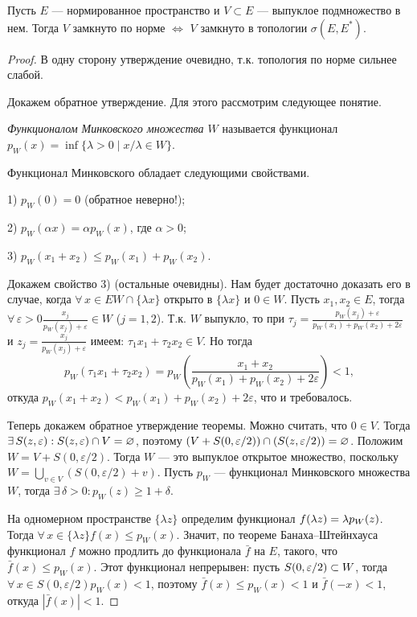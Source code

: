 \documentclass[10pt,titlepage, a4paper]{article}
\begin{document}
\begin{theorem}
Пусть $E$ --- нормированное пространство  и $V\subset E$ ---
выпуклое подмножество в нем. Тогда $V$ замкнуто по норме
$\Leftrightarrow$ $V$ замкнуто в топологии $\sigma(E, E^*)$.
\end{theorem}

\begin{proof}
В одну сторону утверждение очевидно, т.к. топология по норме сильнее
слабой.

Докажем обратное утверждение. Для этого рассмотрим следующее
понятие.

\begin{defen}
\emph{Функционалом Минковского множества $W$} называется функционал
$p_W(x)=\inf\{\lambda>0\mid x/\lambda\in W\}$.
\end{defen}

Функционал Минковского обладает следующими свойствами.

1) $p_W(0)=0$  (обратное неверно!);

2) $p_W(\alpha x)=\alpha p_W(x)$, где $\alpha>0$;

3) $p_W(x_1+x_2)\leqslant p_W(x_1)+p_W(x_2)$.

Докажем свойство 3) (остальные очевидны). Нам будет достаточно
доказать его в случае, когда $\forall\,x\in E$\;\;$W\cap\{\lambda
x\}$ открыто в $\{\lambda x\}$ и $0\in W$. Пусть $x_1,x_2\in E$,
тогда
$\forall\,\varepsilon>0$\;\;$\frac{x_j}{p_W(x_j)+\varepsilon}\in W$
($j=1,2$). Т.к. $W$ выпукло, то при
$\tau_j=\frac{p_W(x_j)+\varepsilon}{p_W(x_1)+p_W(x_2)+2\varepsilon}$
и $z_j=\frac{x_j}{p_W(x_j)+\varepsilon}$ имеем: $\tau_1
x_1+\tau_2x_2\in V$. Но тогда $$p_W(\tau_1 x_1+\tau_2x_2)=p_W\left(
\frac{x_1+x_2}{p_W(x_1)+p_W(x_2)+2\varepsilon}\right)<1,$$ откуда
$p_W(x_1+x_2)<p_W(x_1)+p_W(x_2)+2\varepsilon$, что и требовалось.

Теперь докажем обратное утверждение теоремы. Можно считать, что
$0\in V$. Тогда $\exists\,S(z,\varepsilon):S(z,\varepsilon)\p\cap
V=\varnothing$, поэтому
$(V+S(0,\varepsilon/2))\p\cap(S(z,\varepsilon/2))=\varnothing$.
Положим $W=V+S(0,\varepsilon/2)$. Тогда $W$ --- это выпуклое
открытое множество, поскольку $W=\bigcup\limits_{v\in
V}(S(0,\varepsilon/2)+v)$. Пусть $p_W$ --- функционал Минковского
множества $W$, тогда $\exists\,\delta>0:p_W(z)\geqslant 1+\delta$.

На одномерном пространстве $\{\lambda z\}$ определим функционал
$f(\lambda z)\p=\lambda p_W(z)$. Тогда $\forall\,x\in\{\lambda
z\}$\;\;$f(x)\leqslant p_W(x)$. Значит, по теореме
Банаха--Штейнхауса функционал $f$ можно продлить до функционала
$\bar{f}$ на $E$, такого, что $\bar{f}(x)\leqslant p_W(x)$. Этот
функционал непрерывен: пусть $S(0,\varepsilon/2)\p\subset W$, тогда
$\forall\,x\in S(0,\varepsilon/2)$\;\;$p_W(x)<1$, поэтому
$\bar{f}(x)\leqslant p_W(x)<1$ и $\bar{f}(-x)<1$, откуда
$|\bar{f}(x)|<1$.


\end{proof}
\end{document}
